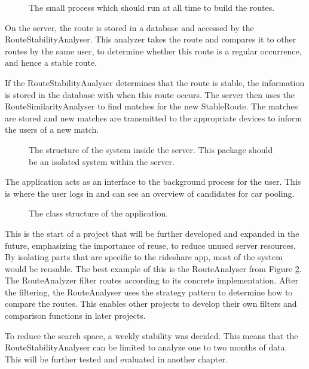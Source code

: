 \begin{figure}[h]
	\centering
	
	\caption{The small process which should run at all time to build the routes.}
	\label{fig:classDiagramSprint1Observer}
\end{figure}


On the server, the route is stored in a database and accessed by the RouteStabilityAnalyser.
This analyzer takes the route and compares it to other routes by the same user, to determine whether this route is a regular occurrence, and hence a stable route.

If the RouteStabilityAnalyser determines that the route is stable, the information is stored in the database with when this route occurs.
The server then uses the RouteSimilarityAnalyser to find matches for the new StableRoute.
The matches are stored and new matches are transmitted to the appropriate devices to inform the users of a new match.

\begin{figure}[h]
	\centering
	
	\caption{The structure of the system inside the server. This package should be an isolated system within the server.}
	\label{fig:classDiagramSprint1Server}
\end{figure}

The application acts as an interface to the background process for the user.
This is where the user logs in and can see an overview of candidates for car pooling.

\begin{figure}[h]
	\centering
	
	\caption{The class structure of the application.}
	\label{fig:classDiagramSprint1Application}
\end{figure}

This is the start of a project that will be further developed and expanded in the future, emphasizing the importance of  reuse, to reduce unused server resources.
By isolating parts that are specific to the rideshare app, most of the system would be reusable.
The best example of this is the RouteAnalyser from Figure \ref{fig:classDiagramSprint1Server}.
The RouteAnalyzer filter routes according to its concrete implementation.
After the filtering, the RouteAnalyser uses the strategy pattern to determine how to compare the routes.
This enables other projects to develop their own filters and comparison functions in later projects.

To reduce the search space, a weekly stability was decided. 
This means that the RouteStabilityAnalyser can be limited to analyze one to two months of data.
This will be further tested and evaluated in another chapter. 